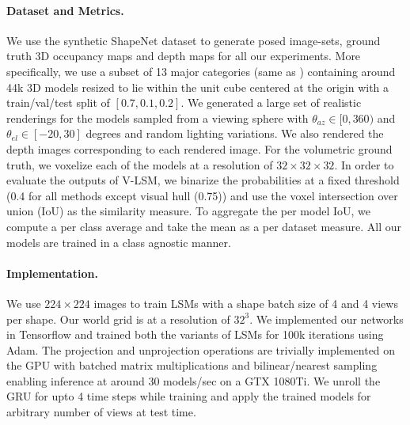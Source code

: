 \documentclass[../thesis.tex]{subfiles}
\begin{document}
\paragraph{Dataset and Metrics.}
We use the synthetic ShapeNet dataset \cite{shapenet2015} to generate posed image-sets, ground truth 3D occupancy maps and depth maps for all our experiments. More specifically, we use a subset of 13 major categories (same as \cite{choy20163d}) containing around 44k 3D models resized to lie within the unit cube centered at the origin with a train/val/test split of $[0.7, 0.1, 0.2]$. We generated a large set of realistic renderings for the models sampled from a viewing sphere with $\theta_{az} \in [0, 360)$ and $\theta_{el} \in [-20, 30]$ degrees and random lighting variations. We also rendered the depth images corresponding to each rendered image. For the volumetric ground truth, we voxelize each of the models at a resolution of $32\times32\times32$. In order to evaluate the outputs of V-LSM, we binarize the probabilities at a fixed threshold (0.4 for all methods except visual hull (0.75)) and use the voxel intersection over union (IoU) as the similarity measure. To aggregate the per model IoU, we compute a per class average and take the mean as a per dataset measure. All our models are trained in a class agnostic manner.

\paragraph{Implementation.}
We use $224 \times 224$ images to train LSMs with a shape batch size of 4 and 4 views per shape. Our world grid is at a resolution of $32^3$. We implemented our networks in Tensorflow and trained both the variants of LSMs for 100k iterations using Adam. The projection and unprojection operations are trivially implemented on the GPU with batched matrix multiplications and bilinear/nearest sampling enabling inference at around 30 models/sec on a GTX 1080Ti. We unroll the GRU for upto 4 time steps while training and apply the trained models for arbitrary number of views at test time.



\end{document}
